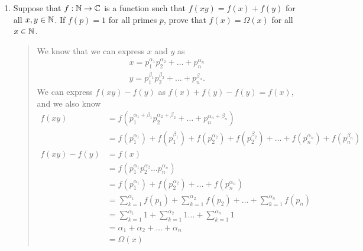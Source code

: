 \documentclass{hw}
\begin{document}
\begin{enumerate}
\item Suppose that $f:\mathbb{N}\to\mathbb{C}$ is a function such that $f(xy)=f(x)+f(y)$ for all $x,y\in\mathbb{N}$. If
$f(p)=1$ for all primes $p$, prove that $f(x)=\Omega(x)$ for all $x\in\mathbb{N}$.
\begin{quote}
We know that we can express $x$ and $y$ as
\begin{gather*}
x=p_{1}^{\alpha_{1}}p_{2}^{\alpha_{2}}+\dots+p_{n}^{\alpha_{n}}\\
y=p_{1}^{\beta_{1}}p_{2}^{\beta_{2}}+\dots+p_{n}^{\beta_{n}}.
\end{gather*}
We can express $f(xy)-f(y)$ as $f(x)+f(y)-f(y)=f(x)$, and we also know
\begin{align*}
f(xy)&=f(p_{1}^{\alpha_{1}+\beta_{1}}p_{2}^{\alpha_{2}+\beta_{2}}+\dots+p_{n}^{\alpha_{n}+\beta_{n}})\\
%
&= f(p_{1}^{\alpha_{1}}) + f(p_{1}^{\beta_{1}}) + f(p_{2}^{\alpha_{2}}) + f(p_{2}^{\beta_{2}})+
\dots + f(p_{n}^{\alpha_{n}}) + f(p_{n}^{\beta_{n}})\\
%
f(xy)-f(y)&=f(x)\\
&=f(p_{1}^{\alpha_{1}}p_{2}^{\alpha_{2}}\dots p_{n}^{\alpha_{n}})\\
%
&=f(p_{1}^{\alpha_{1}})+f(p_{2}^{\alpha_{2}})+\dots+f(p_{n}^{\alpha_{n}})\\
%
&=\sum_{k=1}^{\alpha_{1}}f(p_{1}) + \sum_{k=1}^{\alpha_{2}}f(p_{2}) + \dots +
\sum_{k=1}^{\alpha_{n}}f(p_{n})\\
%
&= \sum_{k=1}^{\alpha_{1}}1 + \sum_{k=1}^{\alpha_{2}}1\dots + \sum_{k=1}^{\alpha_{n}}1\\
&= \alpha_{1} + \alpha_{2} + \dots + \alpha_{n}\\
&=\Omega(x)
\end{align*}
\end{quote}


\end{enumerate}
\end{document}
